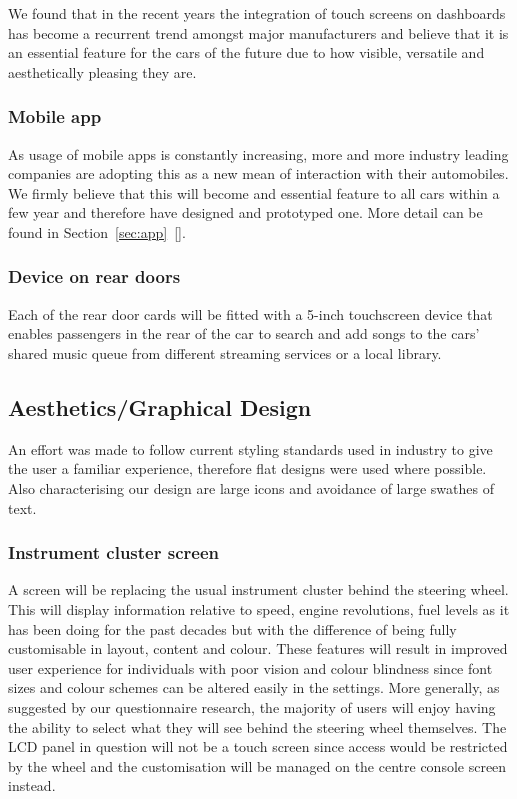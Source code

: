 \documentclass{article}
\begin{document}
We found that in the recent years the integration of touch screens on dashboards has become a recurrent trend amongst major manufacturers and believe that it is an essential feature for the cars of the future due to how visible, versatile and aesthetically pleasing they are.

\subsubsection{Mobile app}\label{sssec:mobile-app}
As usage of mobile apps is constantly increasing, more and more industry leading companies are adopting this as a new mean of interaction with their automobiles. We firmly believe that this will become and essential feature to all cars within a few year and therefore have designed and prototyped one. More detail can be found in Section~\ref{sec:app}~[].

\subsubsection{Device on rear doors}\label{sssec:device-rear-doors}
Each of the rear door cards will be fitted with a 5-inch touchscreen device that enables passengers in the rear of the car to search and add songs to the cars' shared music queue from different streaming services or a local library.

\subsection{Aesthetics/Graphical Design}\label{ssec:aesthetics}
An effort was made to follow current styling standards used in industry to give the user a familiar experience, therefore flat designs were used where possible. Also characterising our design are large icons and avoidance of large swathes of text.

\subsubsection{Instrument cluster screen}\label{sssec:cluster-screen}
A screen will be replacing the usual instrument cluster behind the steering wheel. This will display information relative to speed, engine revolutions, fuel levels as it has been doing for the past decades but with the difference of being fully customisable in layout, content and colour. These features will result in improved user experience for individuals with poor vision and colour blindness since font sizes and colour schemes can be altered easily in the settings. More generally, as suggested by our questionnaire research, the majority of users will enjoy having the ability to select what they will see behind the steering wheel themselves. The LCD panel in question will not be a touch screen since access would be restricted by the wheel and the customisation will be managed on the centre console screen instead.
\end{document}
